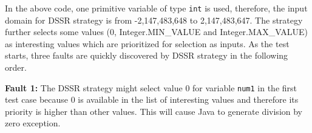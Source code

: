 \documentclass[conference]{IEEEtran}
\begin{document}
%
%
%    
%
%
%
%
%
%

In the above code, one primitive variable of type \verb+int+ is used, therefore, the input domain for DSSR strategy is from -2,147,483,648 to 2,147,483,647. The strategy further selects some values (0, Integer.MIN\_VALUE and Integer.MAX\_VALUE) as interesting values which are prioritized for selection as inputs. 
As the test starts, three faults are quickly discovered by DSSR strategy in the following order.

\indent \textbf{Fault 1:} The DSSR strategy might select value 0 for variable \verb+num1+  in the first test case because 0 is available in the list of interesting values and therefore its priority is higher than other values. This will cause Java to generate division by zero exception.
\end{document}
